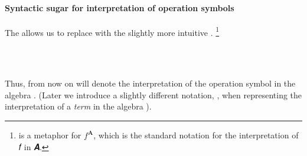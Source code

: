 \documentclass[a4paper,USenglish,cleveref,autoref,thm-restate]{lipics-v2019}
\begin{document}
\paragraph*{Syntactic sugar for interpretation of operation symbols}
The \agdaualib allows us to replace \AgdaSpace{}\AgdaSpace{}\AgdaSpace{}\AgdaSpace{} with the slightly more intuitive \AgdaSpace{}\AgdaSpace{}.%
\footnote{\AgdaSpace{}\AgdaSpace{} is a metaphor for \(f^\mathbf{A}\), which is the standard notation for the interpretation of 𝑓 in 𝑨.}
\begin{code}%
\>[0][@{}l@{\AgdaIndent{0}}]%
\>[1]\AgdaSpace{}%
\AgdaSymbol{:}\AgdaSpace{}%
\AgdaSymbol{(}\AgdaSpace{}%
\AgdaSymbol{:}\AgdaSpace{}%
\AgdaSpace{}%
\AgdaSpace{}%
\AgdaSymbol{)}\AgdaSpace{}%
\AgdaSpace{}%
\AgdaSymbol{(}\AgdaSpace{}%
\AgdaSymbol{:}\AgdaSpace{}%
\AgdaSpace{}%
\AgdaSpace{}%
\AgdaSymbol{)}\AgdaSpace{}%
%
\AgdaSymbol{(}\AgdaSpace{}%
\AgdaSpace{}%
\AgdaSpace{}%
\AgdaSpace{}%
\AgdaSpace{}%
\AgdaSpace{}%
\AgdaSpace{}%
\AgdaSymbol{)}\AgdaSpace{}%
\AgdaSpace{}%
\AgdaSpace{}%
\AgdaSpace{}%
\<%
\\
%
\\[\AgdaEmptyExtraSkip]%
\>[1]\AgdaSpace{}%
\AgdaSpace{}%
\AgdaSpace{}%
\AgdaSymbol{=}\AgdaSpace{}%
\AgdaSpace{}%
\AgdaSpace{}%
\AgdaSpace{}%
\AgdaSymbol{(}\AgdaSpace{}%
\AgdaSpace{}%
\AgdaSpace{}%
\AgdaSymbol{)}\AgdaSpace{}%
\<%
\end{code}
Thus, from now on \AgdaSpace{}\AgdaSpace{}\AgdaSpace{} will denote the interpretation of the operation symbol  in the algebra .  (Later we introduce a slightly different notation, \AgdaSpace{}\AgdaSpace{}, when representing the interpretation of a \emph{term}  in the algebra ).
\end{document}

